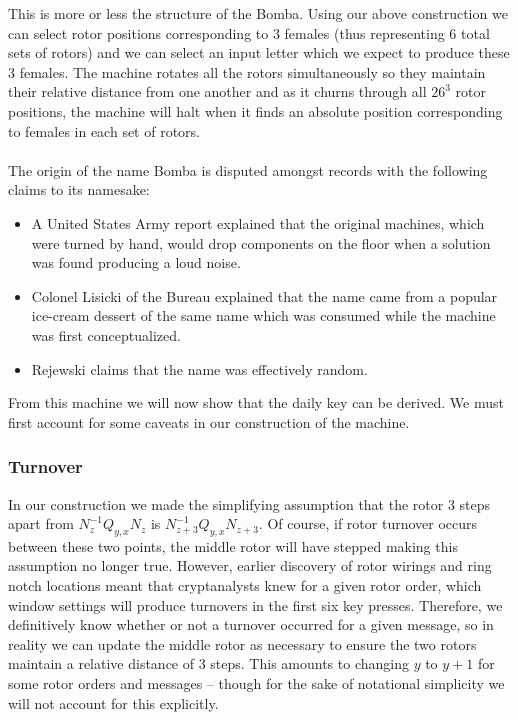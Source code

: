\noindent This is more or less the structure of the Bomba. Using our
above construction we can select rotor positions corresponding to 3
females (thus representing 6 total sets of rotors) and we can select
an input letter which we expect to produce these 3 females. The
machine rotates all the rotors simultaneously so they maintain their
relative distance from one another and as it churns through all
$26^3$ rotor positions, the machine will halt when it finds an
absolute position corresponding to females in each set of rotors. 
\\\\The
origin of the name Bomba is disputed amongst records with the
following claims to its namesake:
\begin{itemize}
  \item A United States Army report explained that the original
    machines, which were turned by hand, would drop components on the
    floor when a solution was found producing a loud noise.
  \item Colonel Lisicki of the Bureau explained that
    the name came from a popular ice-cream dessert of the same name
    which was consumed while the machine was first conceptualized.
  \item Rejewski claims that the name was effectively random.
\end{itemize}
From this machine we will now show that the daily key can be derived.
We must first account for some caveats in our construction of the machine.

\subsubsection{Turnover}
In our construction we made the simplifying assumption that the rotor
3 steps apart from $N_{z}^{-1}Q_{y,x}N_{z}$ is
$N_{z+3}^{-1}Q_{y,x}N_{z+3}$. Of course, if rotor turnover occurs
between these two points, the middle rotor will have stepped making
this assumption no longer true. However, earlier discovery of rotor
wirings and ring notch locations meant that cryptanalysts knew for a
given rotor order, which window settings will produce turnovers in
the first six key presses. Therefore, we definitively know whether or
not a turnover occurred for a given message, so in reality we can
update the middle rotor as necessary to ensure the two rotors
maintain a relative distance of 3 steps. This amounts to changing $y$
to $y+1$ for some rotor orders and messages -- though for the sake of
notational simplicity we will not account for this explicitly.
